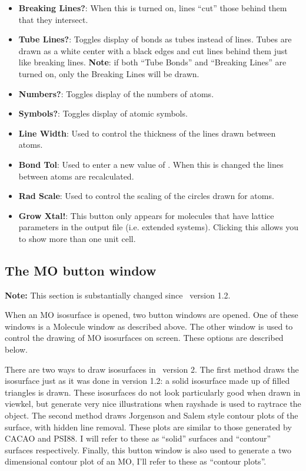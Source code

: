 \begin{itemize}
\item {\bf Breaking Lines?}: When this is turned on, lines ``cut'' those
behind them that they intersect.

\item {\bf Tube Lines?}:  Toggles display of bonds as tubes instead of
lines.  Tubes are drawn as a white center with a black edges and 
cut lines behind them just like breaking lines.  {\bf Note}: if both
``Tube Bonds'' and ``Breaking Lines'' are turned on, only the Breaking
Lines will be drawn.


\item {\bf Numbers?}: Toggles display of the numbers of atoms.

\item {\bf Symbols?}: Toggles display of atomic symbols.

\item {\bf Line Width}: Used to control the thickness of the lines
drawn between atoms.

\item {\bf Bond Tol}: Used to enter a new value of .
When this is changed the lines between atoms are recalculated.

\item {\bf Rad Scale}: Used to control the scaling of the circles
drawn for atoms.

\item {\bf Grow Xtal!}:  This button only appears for molecules that
have lattice parameters in the output file (i.e. extended systems).
Clicking this allows you to show more than one unit cell.

\end{itemize}

\subsection{The MO button window}

{\bf Note:} This section is substantially changed since \viewprog\
version 1.2.

When an MO isosurface is opened, two button windows are opened.  One
of these windows is a Molecule window as described above.  The other
window is used to control the drawing of MO isosurfaces on
screen.  These options are described below.

There are two ways to draw isosurfaces in \viewprog\ version 2.  The
first method draws the isosurface just as it was done in version 1.2:
a solid isosurface made up of filled triangles is drawn.  These
isosurfaces do not look particularly good when drawn in viewkel, but
generate very nice illustrations when {\sf rayshade} is used to
raytrace the object. The second method draws Jorgenson and Salem style
contour plots of the surface, with hidden line removal. These plots
are similar to those generated by {\sf CACAO} and {\sf PSI88}.  I will
refer to these as ``solid'' surfaces and ``contour'' surfaces
respectively.  Finally, this button window is also used to generate a
two dimensional contour plot of an MO, I'll refer to these as ``contour plots''.

